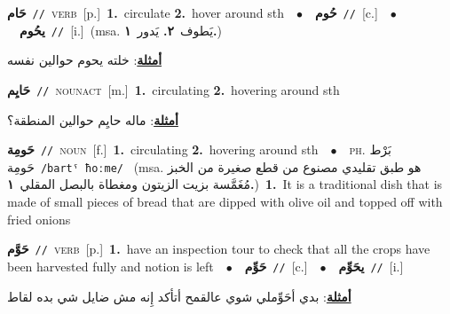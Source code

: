 \documentclass[10pt,a4paper,twoside]{article} %
\begin{document}
\begin{multicols}{2}
{\setlength\topsep{0pt}\textbf{\foreignlanguage{arabic}{حَام}}\ {\color{gray}\texttt{//}\color{black}}\ \textsc{verb}\ [p.]\ \textbf{1.}~circulate  \textbf{2.}~hover around sth\ \ $\bullet$\ \ \setlength\topsep{0pt}\textbf{\foreignlanguage{arabic}{حُوم}}\ {\color{gray}\texttt{//}\color{black}}\ [c.]\ \ $\bullet$\ \ \setlength\topsep{0pt}\textbf{\foreignlanguage{arabic}{يحُوم}}\ {\color{gray}\texttt{//}\color{black}}\ [i.]\ \color{gray}(msa. \foreignlanguage{arabic}{يَطوف}~\foreignlanguage{arabic}{\textbf{٢.}}  \foreignlanguage{arabic}{يَدور}~\foreignlanguage{arabic}{\textbf{١.}})\color{black}\  \begin{flushright}\color{gray}\foreignlanguage{arabic}{\textbf{\underline{\foreignlanguage{arabic}{أمثلة}}}: خلته يحوم حوالين نفسه}\end{flushright}\color{black}} \vspace{2mm}

{\setlength\topsep{0pt}\textbf{\foreignlanguage{arabic}{حَايِم}}\ {\color{gray}\texttt{//}\color{black}}\ \textsc{noun\textunderscore act}\ [m.]\ \textbf{1.}~circulating  \textbf{2.}~hovering around sth\  \begin{flushright}\color{gray}\foreignlanguage{arabic}{\textbf{\underline{\foreignlanguage{arabic}{أمثلة}}}: ماله حايِم حوالين المنطقة؟}\end{flushright}\color{black}} \vspace{2mm}

{\setlength\topsep{0pt}\textbf{\foreignlanguage{arabic}{حَومِة}}\ {\color{gray}\texttt{//}\color{black}}\ \textsc{noun}\ [f.]\ \textbf{1.}~circulating  \textbf{2.}~hovering around sth\ \ $\bullet$\ \ \textsc{ph.} \color{gray} \foreignlanguage{arabic}{بَرْط حَومِة}\color{black}\ {\color{gray}\texttt{/{\sffamily bartˤ ħoːme}/}\color{black}}\ \color{gray} (msa. \foreignlanguage{arabic}{هو طبق تقليدي مصنوع من قطع صغيرة من الخبز مُغَمَّسة بزيت الزيتون ومغطاة بالبصل المقلي}~\foreignlanguage{arabic}{\textbf{١.}})\color{black}\ \textbf{1.}~It is a traditional dish that is made of small pieces of bread that are dipped with olive oil and topped off with fried onions\ } \vspace{2mm}

{\setlength\topsep{0pt}\textbf{\foreignlanguage{arabic}{حَوَّم}}\ {\color{gray}\texttt{//}\color{black}}\ \textsc{verb}\ [p.]\ \textbf{1.}~have an inspection tour to check that all the crops have been harvested fully and notion is left\ \ $\bullet$\ \ \setlength\topsep{0pt}\textbf{\foreignlanguage{arabic}{حَوِّم}}\ {\color{gray}\texttt{//}\color{black}}\ [c.]\ \ $\bullet$\ \ \setlength\topsep{0pt}\textbf{\foreignlanguage{arabic}{يحَوِّم}}\ {\color{gray}\texttt{//}\color{black}}\ [i.]\  \begin{flushright}\color{gray}\foreignlanguage{arabic}{\textbf{\underline{\foreignlanguage{arabic}{أمثلة}}}: بدي أحَوِّملي شوي عالقمح أتأكد إِنه مش ضايل شي بده لقاط}\end{flushright}\color{black}} \vspace{2mm}


\end{multicols}
\end{document}
